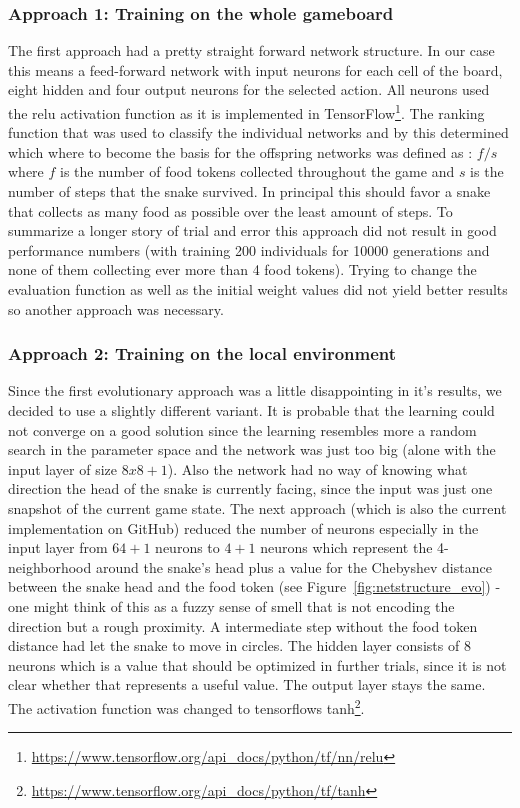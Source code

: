 \documentclass[a4paper]{article}
\begin{document}
\subsubsection{Approach 1: Training on the whole gameboard}
The first approach had a pretty straight forward network structure. 
In our case this means a feed-forward network with input neurons for each cell of the board, eight hidden and four output neurons for the selected action. All neurons used the relu activation function as it is implemented in TensorFlow\footnote{\url{https://www.tensorflow.org/api_docs/python/tf/nn/relu}}. The ranking function that was used to classify the individual networks and by this determined which where to become the basis for the offspring networks was defined as : $f/s$ where $f$ is the number of food tokens collected throughout the game and $s$ is the number of steps that the snake survived. In principal this should favor a snake that collects as many food as possible over the least amount of steps. To summarize a longer story of trial and error this approach did not result in good performance numbers (with training 200 individuals for 10000 generations and none of them collecting ever more than 4 food tokens). Trying to change the evaluation function as well as the initial weight values did not yield better results so another approach was necessary.


\subsubsection{Approach 2: Training on the local environment}
Since the first evolutionary approach was a little disappointing in it's results, we decided to use a slightly different variant. It is probable that the learning could not converge on a good solution since the learning resembles more a random search in the parameter space and the network was just too big (alone with the input layer of size $8x8+1$). Also the network had no way of knowing what direction the head of the snake is currently facing, since the input was just one snapshot of the current game state. The next approach (which is also the current implementation on GitHub) reduced the number of neurons especially in the input layer from $64+1$ neurons to $4+1$ neurons which represent the 4-neighborhood around the snake's head plus a value for the Chebyshev distance between the snake head and the food token (see Figure~\ref{fig:netstructure_evo}) - one might think of this as a fuzzy sense of smell that is not encoding the direction but a rough proximity. A intermediate step without the food token distance had let the snake to move in circles. The hidden layer consists of $8$ neurons which is a value that should be optimized in further trials, since it is not clear whether that represents a useful value. The output layer stays the same. The activation function was changed to tensorflows tanh\footnote{\url{https://www.tensorflow.org/api_docs/python/tf/tanh}}. 
\end{document}

